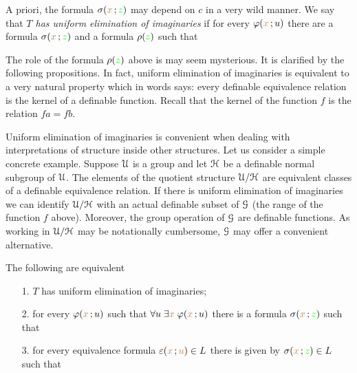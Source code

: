 \documentclass[creche.tex]{subfiles}
\begin{document}

A priori, the formula $\sigma({\color{brown} x}\,;{\color{green} z})$ may depend on $c$ in a very wild manner. We say that \emph{$T$ has uniform elimination of imaginaries\/} if for every $\varphi({\color{brown} x}\,;u)$ there are a formula $\sigma({\color{brown} x}\,;{\color{green} z})$ and a formula $\rho({\color{green} z})$ such that 


The role of the formula $\rho({\color{green} z})$ above is may seem mysterious. It is clarified by the following propositions. In fact, uniform elimination of imaginaries is equivalent to a very natural property which in words says: every definable equivalence relation is the kernel of a definable function. Recall that the kernel of the function $f$ is the relation $fa=fb$.

Uniform elimination of imaginaries is convenient when dealing with interpretations of structure inside other structures. Let us consider a simple concrete example. Suppose $\EuScript U$ is a group and let $\EuScript H$ be a definable normal subgroup of $\EuScript U$. The elements of the quotient structure $\EuScript U/\EuScript H$ are equivalent classes of a definable equivalence relation. If there is uniform elimination of imaginaries we can identify $\EuScript U/\EuScript H$ with an actual definable subset of $\EuScript G$ (the range of the function $f$ above). Moreover, the group operation of $\EuScript G$ are definable functions. As working in $\EuScript U/\EuScript H$ may be notationally cumbersome, $\EuScript G$ may offer a convenient alternative.

\begin{proposition}\label{prop_uei_standard}
The following are equivalent
\begin{itemize}
\item[1.] $T$ has uniform elimination of imaginaries;
\end{itemize}
\begin{itemize}
\item[2.] for every $\varphi({\color{brown} x}\,;u)$ such that  $\forall u\;\exists{\color{brown}x}\;\varphi({\color{brown} x}\,;u)$ there is a formula $\sigma({\color{brown} x}\,;{\color{green} z})$ such that 
\end{itemize}


\begin{itemize}
\item[3.] for every equivalence formula $\varepsilon({\color{brown} x}\,;{\color{brown} u})\in L$ there is given by $\sigma({\color{brown} x}\,;{\color{green} z})\in L$ such that
\end{itemize}



\end{proposition}
\end{document}
